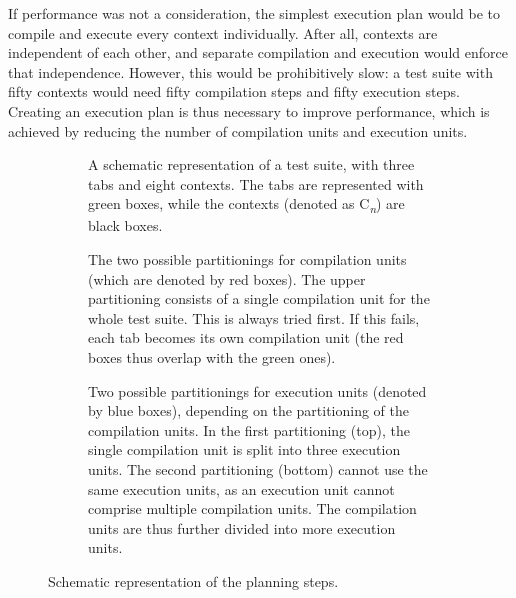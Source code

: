 \documentclass[../main]{subfiles}
\begin{document}
If performance was not a consideration, the simplest execution plan would be to compile and execute every context individually.
After all, contexts are independent of each other, and separate compilation and execution would enforce that independence.
However, this would be prohibitively slow: a test suite with fifty contexts would need fifty compilation steps and fifty execution steps.
Creating an execution plan is thus necessary to improve performance, which is achieved by reducing the number of compilation units and execution units.

\begin{figure}
    \begin{subfigure}{\textwidth}
        \centering
        
        \caption{
            A schematic representation of a test suite, with three tabs and eight contexts.
            The tabs are represented with green boxes, while the contexts (denoted as C\textsubscript*{\textit{n}}) are black boxes.
        }
        \label{fig:planning-suite}
    \end{subfigure}
    \par\bigskip
    \begin{subfigure}{\textwidth}
        \centering
        
        \caption{
            The two possible partitionings for compilation units (which are denoted by red boxes).
            The upper partitioning consists of a single compilation unit for the whole test suite.
            This is always tried first.
            If this fails, each tab becomes its own compilation unit (the red boxes thus overlap with the green ones).
        }
        \label{fig:planning-compilation}
    \end{subfigure}
    \par\bigskip
    \begin{subfigure}{\textwidth}
        \centering
        
        \caption{
            Two possible partitionings for execution units (denoted by blue boxes), depending on the partitioning of the compilation units.
            In the first partitioning (top), the single compilation unit is split into three execution units.
            The second partitioning (bottom) cannot use the same execution units, as an execution unit cannot comprise multiple compilation units.
            The compilation units are thus further divided into more execution units.
        }
        \label{fig:planning-execution}
    \end{subfigure}
    \caption{Schematic representation of the planning steps.}
\end{figure}
\end{document}
